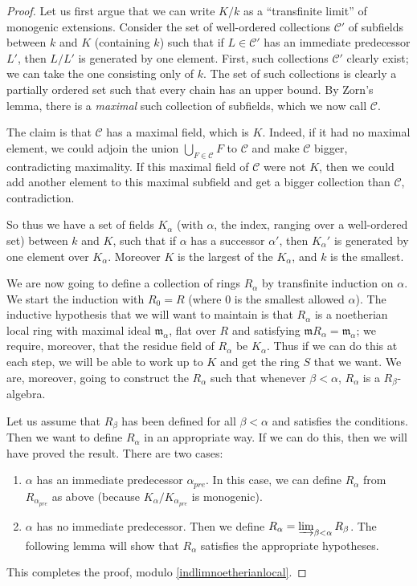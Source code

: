 \begin{proof}
Let us first argue that we can write $K/k$ as a ``transfinite limit'' of
monogenic extensions. Consider the set of   well-ordered collections
$\mathcal{C}'$ of subfields between $k$ and $K$ (containing $k$) such that if $L \in
\mathcal{C}'$ has an immediate predecessor $L'$, then $L/L'$ is generated by
one element. First, such collections $\mathcal{C}'$ clearly exist; we can take
the one consisting only of $k$. The set of such collections is clearly a
partially ordered set such that every chain has an upper bound. 
By Zorn's lemma, there is a \emph{maximal} such collection of subfields, which
we now call $\mathcal{C}$.

The claim is that $\mathcal{C}$ has a maximal field, which is $K$. Indeed, if
it had no maximal element, we could adjoin the union $\bigcup_{F \in
\mathcal{C}} F$ to $\mathcal{C}$ and make $\mathcal{C}$ bigger, contradicting
maximality. If this maximal field of $\mathcal{C}$ were not $K$, then we could add another
element to this maximal subfield and get a bigger collection than
$\mathcal{C}$, contradiction.

So thus we have a  set of fields $K_\alpha$ (with $\alpha$, the
index, ranging over a well-ordered set) between $k$ and $K$,
such that if $\alpha$ has a successor $\alpha'$, then 
$K_\alpha'$ is generated by one element over $K_\alpha$. Moreover $K$ is the
largest of the $K_\alpha$, and $k$ is the smallest. 

We are now going to define a collection of rings $R_\alpha$ by transfinite
induction on $\alpha$. We start the induction with $R_0 = R$ (where $0$ is the
smallest allowed $\alpha$). The inductive hypothesis that we will want to
maintain is that $R_\alpha$ is a noetherian local ring with maximal ideal
$\mathfrak{m}_\alpha$, flat over $R$ and
satisfying $\mathfrak{m} R_\alpha = \mathfrak{m}_\alpha$; we require,
moreover, that the residue field of $R_\alpha$ be $K_\alpha$. Thus if we can
do this at each step, we will be able to work up to $K$ and get the ring $S$
that we want. 
We are, moreover, going to construct the $R_\alpha$ such that whenever $\beta <
\alpha$, $R_\alpha$ is a $R_\beta$-algebra.

Let us assume that $R_\beta$ has been defined for all $\beta < \alpha$ and
satisfies the conditions. Then
we want to define $R_\alpha$ in an appropriate way. If we can do this, then we
will have proved the result. 
There are two cases:
\begin{enumerate}
\item $\alpha$ has an immediate predecessor $\alpha_{pre} $. In this case, we
can define $R_\alpha$ from $R_{\alpha_{pre}}$ as above (because
$K_\alpha/K_{\alpha_{pre}}$ is monogenic).
\item $\alpha$ has no immediate predecessor. Then we define $R_\alpha =
\varinjlim_{\beta < \alpha} R_\beta$. The following lemma will show that
$R_\alpha$ satisfies the appropriate hypotheses.
\end{enumerate}
This completes the proof, modulo \cref{indlimnoetherianlocal}.
\end{proof} 


